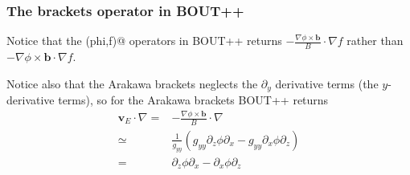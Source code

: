 \documentclass[12pt]{article}
\def\L{\left}
\def\R{\right}
\newcommand{\ve}[1]{\ensuremath{\boldsymbol{#1}}}
\begin{document}
\subsubsection{The brackets operator in BOUT++}
%
Notice that the \verb@brackets(phi,f)@ operators in BOUT++ returns
$-\frac{\nabla\phi\times\ve{b}}{B}\cdot\nabla f$ rather than
$-\nabla\phi\times\ve{b}\cdot\nabla f$.

Notice also that the Arakawa brackets neglects the $\partial_y$ derivative
terms (the $y$-derivative terms), so for the Arakawa brackets BOUT++ returns
%
\begin{align*}
    \ve{v}_E\cdot\nabla
    =& -\frac{\nabla\phi\times\ve{b}}{B}\cdot\nabla\\
    \simeq& \frac{1}{g_{yy}}
	       \L(
	         g_{yy}\partial_z\phi\partial_x- g_{yy}\partial_x\phi\partial_z
	       \R)\\
    =& \partial_z\phi\partial_x - \partial_x\phi\partial_z
\end{align*}
%
\end{document}
